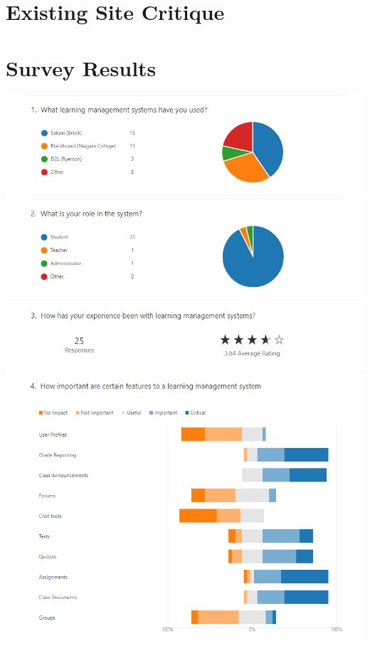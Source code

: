 \documentclass[12pt]{article}
\begin{document}


    \section{Existing Site Critique}\label{sec:existing-site-critique}



    \section{Survey Results}\label{sec:survey-results}

    \includegraphics[width=\textwidth]{survey/1.png}
    \includegraphics[width=\textwidth]{survey/2.png}
    \includegraphics[width=\textwidth]{survey/3.png}
    \includegraphics[width=\textwidth]{survey/4.png}
\end{document}
